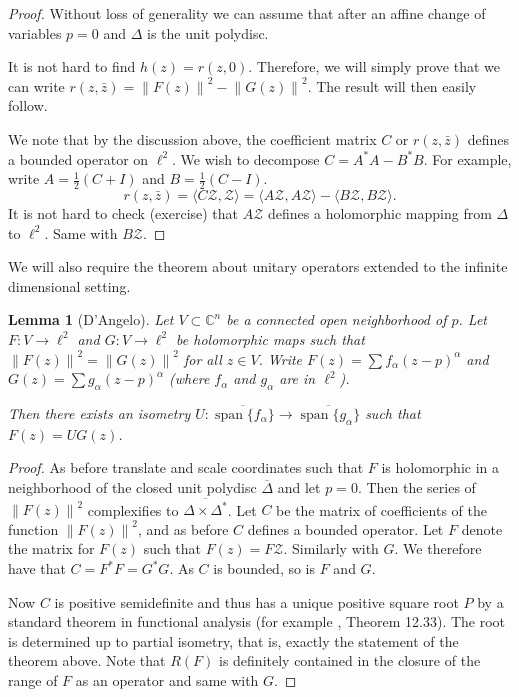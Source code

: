 \documentclass[12pt,openany]{book}
\newcommand{\norm}[1]{\left\lVert {#1} \right\rVert}
\newcommand{\C}{{\mathbb{C}}}
\newcommand{\sZ}{{\mathcal{Z}}}
\theoremstyle{plain}
\newtheorem{lemma}[thm]{Lemma}
\theoremstyle{remark}
\theoremstyle{definition}
\theoremstyle{exercise}
\theoremstyle{example}
\begin{document}
\begin{proof}
Without loss of generality we can assume that after an affine
change of variables $p =0$ and $\Delta$ is the unit polydisc.

It is not hard to find $h(z) = r(z,0)$.  Therefore, we will simply prove
that we can write 
$r(z,\bar{z}) = \norm{F(z)}^2 - \norm{G(z)}^2$.  The result will then easily
follow.

We note that by the discussion above, the coefficient matrix $C$ or
$r(z,\bar{z})$ defines
a bounded operator on $\ell^2$.  We wish to decompose $C = A^*A - B^*B$.  For example,
write $A = \frac{1}{2} (C+I)$ and $B = \frac{1}{2} (C-I)$.
\begin{equation}
r(z,\bar{z}) = \langle C \sZ , \sZ \rangle
=
\langle A \sZ , A \sZ \rangle
-
\langle B \sZ , B \sZ \rangle .
\end{equation}
It is not hard to check (exercise) that $A \sZ$ defines a holomorphic mapping from
$\Delta$ to $\ell^2$.  Same with $B \sZ$.
\end{proof}

We will also require the theorem about unitary operators extended to the
infinite dimensional setting.

\begin{lemma}[D'Angelo] \label{lemma:extU}
Let $V \subset \C^n$ be a connected open neighborhood of $p$.
Let $F \colon V \to \ell^2$ and 
$G \colon V \to \ell^2$ be holomorphic maps such that
$\norm{F(z)}^2 = \norm{G(z)}^2$ for all $z \in V$. 
Write $F(z) = \sum f_\alpha {(z-p)}^\alpha$ and 
$G(z) = \sum g_\alpha {(z-p)}^\alpha$ (where $f_\alpha$ and $g_\alpha$ are in
$\ell^2$).

Then 
there exists an isometry $U \colon
\overline{\operatorname{span}\{f_\alpha\}}
\to
\overline{\operatorname{span}\{g_\alpha\}}$
such that
$F(z) = U G(z)$.
\end{lemma}

\begin{proof}
As before translate and scale coordinates
such that $F$ is holomorphic in a neighborhood of
the closed unit polydisc $\overline{\Delta}$ and let $p=0$.
Then the series of $\norm{F(z)}^2$ complexifies to
$\overline{\Delta \times \Delta^*}$.
Let $C$ be the matrix
of coefficients of the function $\norm{F(z)}^2$, and as before $C$
defines a bounded operator.
  Let $F$ denote the
matrix for $F(z)$ such that $F(z) = F \sZ$.  Similarly with $G$.  We
therefore have that $C = F^*F = G^*G$.  As $C$ is bounded, so is $F$ and $G$.

Now $C$ is positive semidefinite and thus has a unique positive square root
$P$ by a standard theorem in functional analysis (for example
\cite{Rudin:fanal}, Theorem 12.33).  The root is determined up to partial isometry, that is,
exactly the statement of the theorem above.  Note that $R(F)$ is definitely
contained in the closure of the range of $F$ as an operator and same with
$G$.
\end{proof}
\end{document}
